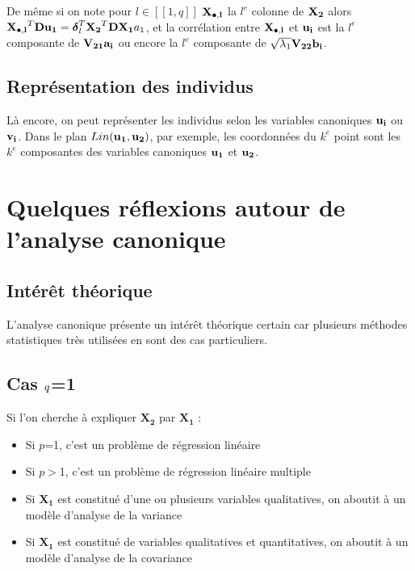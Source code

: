 \documentclass[letterpaper,10pt,french]{sphinxmanual}
\begin{document}
\sphinxAtStartPar
De même si on note pour \(l\in[\![1,q]\!]\) \({\bf X_{\bullet,l}}\) la \(l^e\) colonne de \({\bf X_2}\) alors \({\bf X_{\bullet,l}}^T{\bf D}{\bf {\bf u_1}}={\boldsymbol \delta_l^T}{\bf X_2}^T{\bf D}{\bf X_1}a_1\), et la corrélation entre \({\bf X_{\bullet,l}}\) et \({\bf u_i}\) est la \(l^e\) composante de \({\bf V_{21}}{\bf a_i}\) ou encore la \(l^e\) composante de \(\sqrt{\lambda_1}{\bf V_{22}}{\bf b_i}\).


\subsection{Représentation des individus}
\label{\detokenize{canonique:representation-des-individus}}
\sphinxAtStartPar
Là encore, on peut représenter les individus selon les variables canoniques \({\bf u_i}\) ou \({\bf v_i}\). Dans le plan \(Lin({\bf {\bf u_1}},{\bf {\bf u_2}})\), par exemple, les coordonnées du \(k^e\) point sont les \(k^e\) composantes des variables canoniques \({\bf {\bf u_1}}\) et \({\bf {\bf u_2}}\).


\section{Quelques réflexions autour de l’analyse canonique}
\label{\detokenize{canonique:quelques-reflexions-autour-de-l-analyse-canonique}}

\subsection{Intérêt théorique}
\label{\detokenize{canonique:interet-theorique}}
\sphinxAtStartPar
L’analyse canonique présente un intérêt théorique certain car plusieurs méthodes statistiques très utilisées en sont des cas particuliers.


\subsection{Cas \protect\(q\protect\)=1}
\label{\detokenize{canonique:cas-q-1}}
\sphinxAtStartPar
Si l’on cherche à expliquer \(\mathbf{X_2}\)  par \(\mathbf{X_1}\) :
\begin{itemize}
\item {} 
\sphinxAtStartPar
Si \(p\)=1, c’est un problème de régression linéaire

\item {} 
\sphinxAtStartPar
Si \(p>\)1, c’est un problème de régression linéaire multiple

\item {} 
\sphinxAtStartPar
Si  \(\mathbf{X_1}\) est constitué d’une ou plusieurs variables qualitatives, on aboutit à un modèle d’analyse de la variance

\item {} 
\sphinxAtStartPar
Si  \(\mathbf{X_1}\) est constitué de variables qualitatives et quantitatives, on aboutit à un modèle d’analyse de la covariance

\end{itemize}
\end{document}

